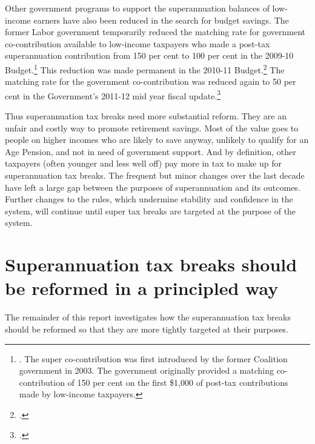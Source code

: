 \documentclass{grattanAlpha}
\begin{document}
Other government programs to support the superannuation balances of low-income earners have also been reduced in the search for budget savings. The former Labor government temporarily reduced the matching rate for government co-contribution available to low-income taxpayers who made a post-tax superannuation contribution from 150 per cent to 100 per cent in the 2009-10 Budget.\footnote{\textcite{Treasury2009BudgetPapers0910}. The super co-contribution was first introduced by the former Coalition government in 2003. The government originally provided a matching co-contribution\DEVIATION{} of 150 per cent on the first \$1,000 of post-tax contributions made by low-income taxpayers.}   
This reduction was made permanent in the 2010-11 Budget.\footcite[][298]{Treasury2010Budget1011no2}  
The matching rate for the government co-contribution was reduced again to 50 per cent in the Government’s 2011-12 mid year fiscal update.\footcite[][291]{Treasury2011MYEFO1112} 

Thus superannuation tax breaks need more substantial reform. They are an unfair and costly way to promote retirement savings. Most of the value goes to people on higher incomes who are likely to save anyway, unlikely to qualify for an Age Pension, and not in need of government support. And by definition, other taxpayers (often younger and less well off) pay more in tax to make up for superannuation tax breaks. The frequent but minor changes over the last decade have left a large gap between the purposes of superannuation and its outcomes. Further changes to the rules, which undermine stability and confidence in the system, will continue until super tax breaks are targeted at the purpose of the system.

\section{Superannuation tax breaks should be reformed in a principled way\label{sec:SUPER-3-9}}
The remainder of this report investigates how the superannuation tax breaks should be reformed so that they are more tightly targeted at their purposes. 
\end{document}
